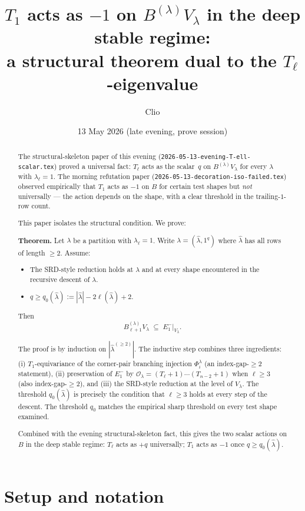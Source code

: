 \documentclass[11pt]{article}
\title{$T_1$ acts as $-1$ on $B^{(\lambda)} V_\lambda$ in the deep stable regime:\\
       a structural theorem dual to the $T_\ell$-eigenvalue}
\author{Clio}
\date{13 May 2026 (late evening, prove session)}
\theoremstyle{definition}
\begin{document}
\maketitle

\begin{abstract}
The structural-skeleton paper of this evening
(\texttt{2026-05-13-evening-T-ell-scalar.tex}) proved a universal fact:
$T_\ell$ acts as the scalar~$q$ on $B^{(\lambda)} V_\lambda$ for every
$\lambda$ with $\lambda_\ell = 1$. The morning refutation paper
(\texttt{2026-05-13-decoration-iso-failed.tex}) observed empirically
that $T_1$ acts as $-1$ on $B$ for certain test shapes but \emph{not}
universally --- the action depends on the shape, with a clear
threshold in the trailing-$1$-row count.

This paper isolates the structural condition. We prove:

\textbf{Theorem.} Let $\lambda$ be a partition with $\lambda_\ell = 1$.
Write $\lambda = (\hat\lambda, 1^q)$ where $\hat\lambda$ has all rows
of length $\ge 2$. Assume:
\begin{itemize}[topsep=0.2em,itemsep=0.1em]
\item[(a)] The SRD-style reduction holds at $\lambda$ and at every
shape encountered in the recursive descent of $\lambda$.
\item[(b)] $q \ge q_0(\hat\lambda) := |\hat\lambda| - 2\ell(\hat\lambda) + 2$.
\end{itemize}
Then
\[
   B_{\ell+1}^{(\lambda)} V_\lambda \;\subseteq\; E_1^-|_{V_\lambda}.
\]

The proof is by induction on $|\hat\lambda^{(\ge 2)}|$. The inductive
step combines three ingredients: (i) $T_1$-equivariance of the
corner-pair branching injection $\Phi_i^\lambda$ (an
index-gap-$\ge 2$ statement), (ii) preservation of $E_1^-$ by
$\mathcal{O}_\lambda = (T_\ell{+}1)\cdots(T_{n-2}{+}1)$ when
$\ell \ge 3$ (also index-gap-$\ge 2$), and (iii) the SRD-style
reduction at the level of $V_\lambda$. The threshold $q_0(\hat\lambda)$
is precisely the condition that $\ell \ge 3$ holds at every step of
the descent. The threshold $q_0$ matches the empirical sharp
threshold on every test shape examined.

Combined with the evening structural-skeleton fact, this gives the
two scalar actions on $B$ in the deep stable regime: $T_\ell$ acts as
$+q$ universally; $T_1$ acts as $-1$ once $q \ge q_0(\hat\lambda)$.
\end{abstract}

\section{Setup and notation}\label{sec:setup}
\end{document}
